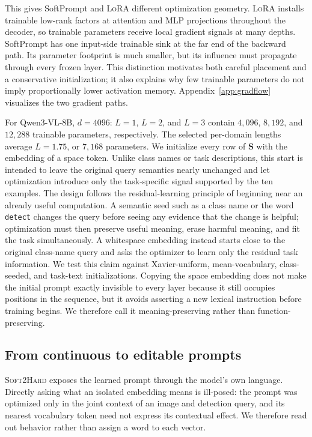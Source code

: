 \documentclass{article}
\newcommand{\lora}{\textsc{LoRA}}
\newcommand{\distill}{\textsc{Soft2Hard}}
\newcommand{\qwen}{Qwen3-VL}
\begin{document}
This gives SoftPrompt and \lora{} different optimization geometry.
\lora{} installs trainable low-rank factors at attention and MLP projections
throughout the decoder, so trainable parameters receive local gradient signals
at many depths. SoftPrompt has one input-side trainable sink at the far end of
the backward path. Its parameter footprint is much smaller, but its influence
must propagate through every frozen layer. This distinction motivates both
careful placement and a conservative initialization; it also explains why few
trainable parameters do not imply proportionally lower activation memory.
Appendix~\ref{app:gradflow} visualizes the two gradient paths.

For \qwen{}-8B, $d=4096$: $L=1$, $L=2$, and $L=3$ contain $4{,}096$,
$8{,}192$, and $12{,}288$ trainable parameters, respectively.
The selected per-domain lengths average $L=1.75$, or $7{,}168$ parameters.
We initialize every row of $\mathbf S$ with the embedding of a space token.
Unlike class names or task descriptions, this start is intended to leave the
original query semantics nearly unchanged and let optimization introduce only
the task-specific signal supported by the ten examples.
The design follows the residual-learning principle of beginning near an
already useful computation. A semantic seed such as a class name or the word
\texttt{detect} changes the query before seeing any evidence that the change is
helpful; optimization must then preserve useful meaning, erase harmful
meaning, and fit the task simultaneously. A whitespace embedding instead
starts close to the original class-name query and asks the optimizer to learn
only the residual task information.
We test this claim against Xavier-uniform, mean-vocabulary, class-seeded, and
task-text initializations. Copying the space embedding does not make the
initial prompt exactly invisible to every layer because it still occupies
positions in the sequence, but it avoids asserting a new lexical instruction before
training begins. We therefore call it meaning-preserving rather than
function-preserving.

\subsection{From continuous to editable prompts}
\label{subsec:method_distill}

\distill{} exposes the learned prompt through the model's own language.
Directly asking what an isolated embedding means is ill-posed: the prompt was
optimized only in the joint context of an image and detection query, and its
nearest vocabulary token need not express its contextual effect. We therefore
read out behavior rather than assign a word to each vector.
\end{document}

